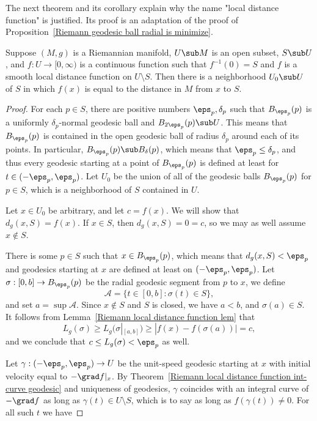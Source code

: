 The next theorem and its corollary explain why the name "local distance function" is justified. Its proof is an adaptation of the proof of Proposition~\ref{Riemann geodesic ball radial is minimize}.
\begin{theorem}\label{Riemann local distance function is locally distance}
Suppose $(M,g)$ is a Riemannian manifold, $U\sub M$ is an open subset, $S\sub U$, and $f:U\to[0,\infty)$ is a continuous function such that $f^{-1}(0)=S$ and $f$ is a 
smooth local distance function on $U\setminus S$. Then there is a neighborhood $U_0\sub U$ of $S$ in which $f(x)$ is equal to the distance in $M$ from $x$ to $S$.
\end{theorem}
\begin{proof}
For each $p\in S$, there are positive numbers $\eps_p,\delta_p$ such that $B_{\eps_p}(p)$ is a uniformly $\delta_p$-normal geodesic ball and $B_{2\eps_p}(p)\sub U$. This 
means that $B_{\eps_p}(p)$ is contained in the open geodesic ball of radius $\delta_p$ around each of its points. In particular, $B_{\eps_p}(p)\sub B_{\delta}(p)$, which means that $\eps_p\leq\delta_p$, and thus every geodesic starting at a point of $B_{\eps_p}(p)$ is defined at least for $t\in(-\eps_p,\eps_p)$. Let $U_0$ be the union of all of the geodesic balls $B_{\eps_p}(p)$ for $p\in S$, which is a neighborhood of $S$ contained in $U$.\par
Let $x\in U_0$ be arbitrary, and let $c=f(x)$. We will show that $d_g(x,S)=f(x)$. If $x\in S$, then $d_g(x,S)=0=c$, so we may as well assume $x\notin S$.\par
There is some $p\in S$ such that $x\in B_{\eps_p}(p)$, which means that $d_g(x,S)<\eps_p$ and geodesics starting at $x$ are defined at least on $(-\eps_p,\eps_p)$. Let $\sigma:[0,b]\to B_{\eps_p}(p)$ be the radial geodesic segment from $p$ to $x$, we define
\[\mathcal{A}=\{t\in[0,b]:\sigma(t)\in S\},\]
and set $a=\sup\mathcal{A}$. Since $x\notin S$ and $S$ is closed, we have $a<b$, and $\sigma(a)\in S$. It follows from Lemma~\ref{Riemann local distance function lem} 
that 
\[L_g(\sigma)\geq L_g(\sigma|_{[a,b]})\geq |f(x)-f(\sigma(a))|=c,\]
and we conclude that $c\leq L_g(\sigma)<\eps_p$ as well.\par
Let $\gamma:(-\eps_p,\eps_p)\to U$ be the unit-speed geodesic starting at $x$ with initial velocity equal to $-\grad f|_x$. By 
Theorem~\ref{Riemann local distance function int-curve geodesic} and uniqueness of geodesics, $\gamma$ coincides with an integral curve of $-\grad f$ as long as 
$\gamma(t)\in U\setminus S$, which is to say as long as $f(\gamma(t))\neq 0$. For all such $t$ we have

\end{proof}
